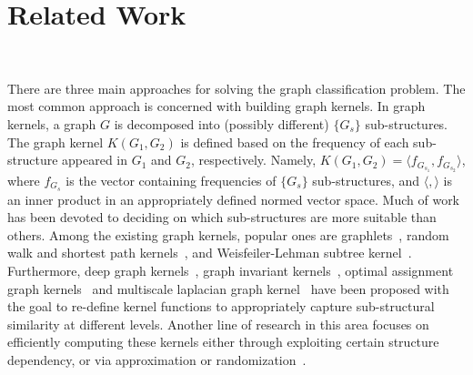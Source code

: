 \documentclass{article}
\newcommand{\Fa}{\pazocal{F}}
\newcommand{\Ra}{\pazocal{R}}
\begin{document}
\section{Related Work}~\label{sec:related_work}

 
There are three main approaches for solving the graph classification problem. The most common approach is concerned with building graph kernels. In graph kernels, a graph $G$ is decomposed into (possibly different) $\{G_{s}\}$ sub-structures. The graph kernel $K(G_1,G_2)$   is defined based on the frequency of each sub-structure appeared in $G_1$ and $G_2$, respectively. Namely, $K(G_1,G_2)=\langle f_{G_{s_1}},f_{G_{s_2}}\rangle$, where $f_{G_{s}}$ is the vector containing  frequencies of  $\{G_{s}\}$ sub-structures, and $\langle,\rangle$ is an inner product in an appropriately defined normed vector space. Much of work has been devoted to deciding on which sub-structures are more suitable than  others. %
Among the existing graph kernels, popular ones are  graphlets~\cite{prvzulj2007biological,shervashidze2009efficient}, random walk and shortest path kernels~\cite{kashima2003marginalized,borgwardt2005shortest}, and Weisfeiler-Lehman subtree kernel~\cite{shervashidze2011weisfeiler}. Furthermore, deep graph kernels~\cite{yanardag2015deep}, graph invariant  kernels~\cite{orsini2015graph}, optimal  assignment graph kernels~\cite{kriege2016valid}  and  multiscale laplacian graph kernel~\cite{kondor2016multiscale}  have been proposed with the goal to re-define kernel functions   to appropriately capture sub-structural similarity at different levels.  Another line of research in this area focuses on  efficiently computing  these kernels either through exploiting certain structure dependency, or via approximation or randomization~\cite{feragen2013scalable,de2013fast,neumann2012efficient}.  %

\end{document}

